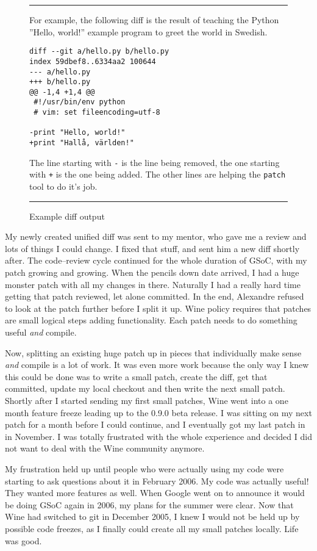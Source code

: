 \begin{figure}[!h]
\rule{\textwidth}{0.3pt}

For example, the following diff is the result of teaching the Python ''Hello,
world!'' example program to greet the world in Swedish.

\begin{verbatim}
diff --git a/hello.py b/hello.py
index 59dbef8..6334aa2 100644
--- a/hello.py
+++ b/hello.py
@@ -1,4 +1,4 @@
 #!/usr/bin/env python
 # vim: set fileencoding=utf-8

-print "Hello, world!"
+print "Hallå, världen!"
\end{verbatim}

The line starting with \texttt{-} is the line being removed, the one starting
with \texttt{+} is the one being added. The other lines are helping the
\texttt{patch} tool to do it's job.

\rule{\textwidth}{0.3pt}
\caption{Example diff output}
\end{figure}

My newly created unified diff was sent to my mentor, who gave me a review and
lots of things I could change. I fixed that stuff, and sent him a new diff
shortly after. The code--review cycle continued for the whole duration of GSoC,
with my patch growing and growing. When the pencils down date arrived, I had
a huge monster patch with all my changes in there. Naturally I had a really hard
time getting that patch reviewed, let alone committed. In the end, Alexandre
refused to look at the patch further before I split it up. Wine policy requires
that patches are small logical steps adding functionality. Each patch needs to
do something useful \emph{and} compile.

Now, splitting an existing huge patch up in pieces that individually make sense
\emph{and} compile is a lot of work. It was even more work because the only way
I knew this could be done was to write a small patch, create the diff, get that
committed, update my local checkout and then write the next small patch. Shortly
after I started sending my first small patches, Wine went into a one month
feature freeze leading up to the 0.9.0 beta release. I was sitting on my next
patch for a month before I could continue, and I eventually got my last patch in
in November. I was totally frustrated with the whole experience and decided I
did not want to deal with the Wine community anymore.

My frustration held up until people who were actually using my code were
starting to ask questions about it in February 2006. My code was actually
useful! They wanted more features as well. When Google went on to announce it
would be doing GSoC again in 2006, my plans for the summer were clear. Now that
Wine had switched to git in December 2005, I knew I would not be held up by
possible code freezes, as I finally could create all my small patches locally.
Life was good.

